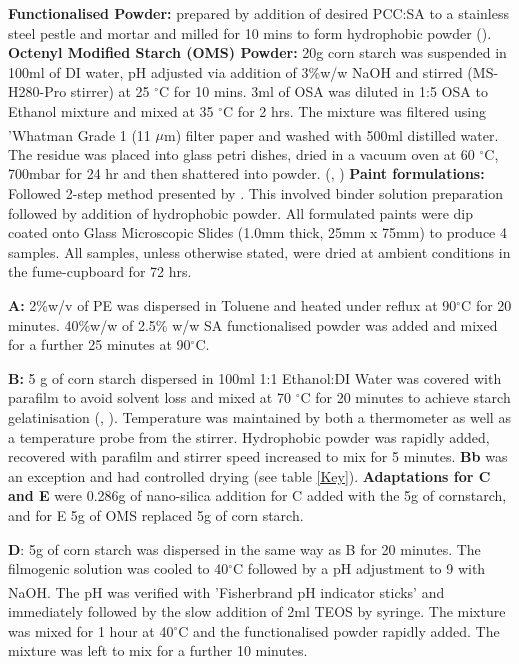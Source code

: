 \textbf{Functionalised Powder:} prepared by addition of desired PCC:SA to a stainless steel pestle and mortar and milled for 10 mins to form hydrophobic powder (\cite{fang_2019}). 
\newline \textbf{Octenyl Modified Starch (OMS) Powder:} 20g corn starch was suspended in 100ml of DI water, pH adjusted via addition of 3\%w/w NaOH and stirred (MS-H280-Pro stirrer) at 25 $^{\circ}$C for 10 mins. 3ml of OSA was diluted in 1:5 OSA to Ethanol mixture and mixed at 35 $^{\circ}$C for 2 hrs. The mixture was filtered using 'Whatman \textsuperscript \textregistered  Grade 1 (11 $\mu$m) filter paper and washed with 500ml distilled water. The residue was placed into glass petri dishes, dried in a vacuum oven at 60 $^\circ$C, 700mbar for 24 hr and then shattered into powder. (\cite{OMSProcess}, \cite{PowderShatter})
\newline \textbf{Paint formulations:} Followed 2-step method presented by \cite{tzouganatos_2015}.  This involved binder solution preparation followed by addition of hydrophobic powder. All formulated paints were dip coated onto Glass Microscopic Slides (1.0mm thick, 25mm x 75mm) to produce 4 samples. All samples, unless otherwise stated, were dried at ambient conditions in the fume-cupboard for 72 hrs.  
\par \textbf{A:} 2\%w/v of PE was dispersed in Toluene and heated under reflux at 90$^{\circ}$C for 20 minutes.  40\%w/w of 2.5\% w/w SA functionalised powder was added and mixed for a further 25 minutes at 90$^{\circ}$C.  
\par \textbf{B:} 5 g of corn starch dispersed in 100ml 1:1 Ethanol:DI Water was covered with parafilm to avoid solvent loss and mixed at 70 $^{\circ}$C for 20 minutes to achieve starch gelatinisation (\cite{5starch}, \cite{StarchGel}). Temperature was maintained by both a thermometer as well as a temperature probe from the stirrer. Hydrophobic powder was rapidly added, recovered with parafilm and stirrer speed increased to mix for 5 minutes. \textbf{Bb} was an exception and had controlled drying (see table \ref{Key}). \textbf{Adaptations for C and E} were 0.286g of nano-silica addition for C added with the 5g of cornstarch, and for E 5g of OMS replaced 5g of corn starch. 
\par \textbf{D}: 5g of corn starch was dispersed in the same way as B for 20 minutes. The filmogenic solution was cooled to 40$^{\circ}$C followed by a pH adjustment to 9 with NaOH. The pH was verified with 'Fisherbrand \textsuperscript \textregistered pH indicator sticks' and immediately followed by the slow addition of 2ml TEOS by syringe. The mixture was mixed for 1 hour at 40$^{\circ}$C and the functionalised powder rapidly added. The mixture was left to mix for a further 10 minutes.

